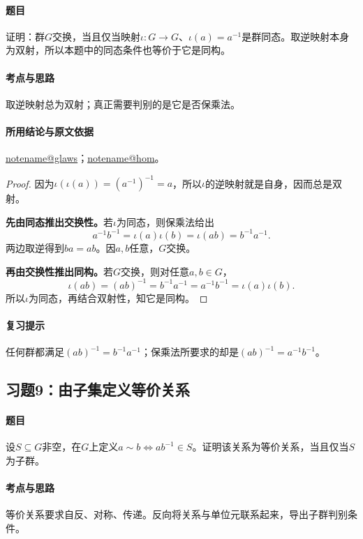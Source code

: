 \documentclass[UTF8,a4paper,11pt,fontset=windows]{ctexart}
\makeatletter
\newcommand{\noteref}[1]{\hyperref[note:#1]{\csname notename@#1\endcsname}}
\newcommand{\exref}[2]{\hyperref[ex:#1:#2]{第#1章习题#2}}
\makeatother
\begin{document}
\paragraph{题目}
证明：群$G$交换，当且仅当映射$\iota:G\to G$、$\iota(a)=a^{-1}$是群同态。取逆映射本身为双射，所以本题中的同态条件也等价于它是同构。

\paragraph{考点与思路}
取逆映射总为双射；真正需要判别的是它是否保乘法。

\paragraph{所用结论与原文依据}
\noteref{glaws}；\noteref{hom}。


\begin{proof}
因为$\iota(\iota(a))=(a^{-1})^{-1}=a$，所以$\iota$的逆映射就是自身，因而总是双射。

\textbf{先由同态推出交换性。}若$\iota$为同态，则保乘法给出
\[
a^{-1}b^{-1}=\iota(a)\iota(b)=\iota(ab)=b^{-1}a^{-1}.
\]
两边取逆得到$ba=ab$。因$a,b$任意，$G$交换。

\textbf{再由交换性推出同构。}若$G$交换，则对任意$a,b\in G$，
\[
\iota(ab)=(ab)^{-1}=b^{-1}a^{-1}=a^{-1}b^{-1}=\iota(a)\iota(b).
\]
所以$\iota$为同态，再结合双射性，知它是同构。
\end{proof}

\paragraph{复习提示}
任何群都满足$(ab)^{-1}=b^{-1}a^{-1}$；保乘法所要求的却是$(ab)^{-1}=a^{-1}b^{-1}$。


\subsection{习题9：\texorpdfstring{由子集定义等价关系}{由子集定义等价关系}}
\label{ex:1:9}

\paragraph{题目}
设$S\subseteq G$非空，在$G$上定义$a\sim b\iff ab^{-1}\in S$。证明该关系为等价关系，当且仅当$S$为子群。

\paragraph{考点与思路}
等价关系要求自反、对称、传递。反向将关系与单位元联系起来，导出子群判别条件。
\end{document}
